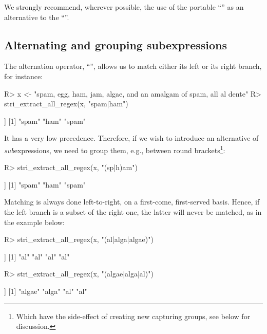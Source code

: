 \documentclass[nojss]{jss}
\begin{document}
We strongly recommend, wherever possible, the use of the portable
``''
as an alternative to the  ``\code{[:punct:]}''.



\subsection{Alternating and grouping subexpressions}

The alternation operator, ``\code{|}'',
allows us to match either its left or its right branch,
for instance:

\begin{Schunk}
\begin{Sinput}
R> x <- "spam, egg, ham, jam, algae, and an amalgam of spam, all al dente"
R> stri_extract_all_regex(x, "spam|ham")
\end{Sinput}
\begin{Soutput}
[[1]]
[1] "spam" "ham"  "spam"
\end{Soutput}
\end{Schunk}

It has a very low precedence. Therefore, if we wish to
introduce an alternative of \textit{sub}expressions,
we need to group them, e.g., between round brackets\footnote{Which have
the side-effect of creating new capturing groups, see below for discussion.}:

\begin{Schunk}
\begin{Sinput}
R> stri_extract_all_regex(x, "(sp|h)am")
\end{Sinput}
\begin{Soutput}
[[1]]
[1] "spam" "ham"  "spam"
\end{Soutput}
\end{Schunk}

Matching is always done left-to-right, on a first-come, first-served basis.
Hence, if the left branch is a subset of the right one, the latter will
never be matched, as in the example below:

\begin{Schunk}
\begin{Sinput}
R> stri_extract_all_regex(x, "(al|alga|algae)")
\end{Sinput}
\begin{Soutput}
[[1]]
[1] "al" "al" "al" "al"
\end{Soutput}
\begin{Sinput}
R> stri_extract_all_regex(x, "(algae|alga|al)")
\end{Sinput}
\begin{Soutput}
[[1]]
[1] "algae" "alga"  "al"    "al"
\end{Soutput}
\end{Schunk}
\end{document}
